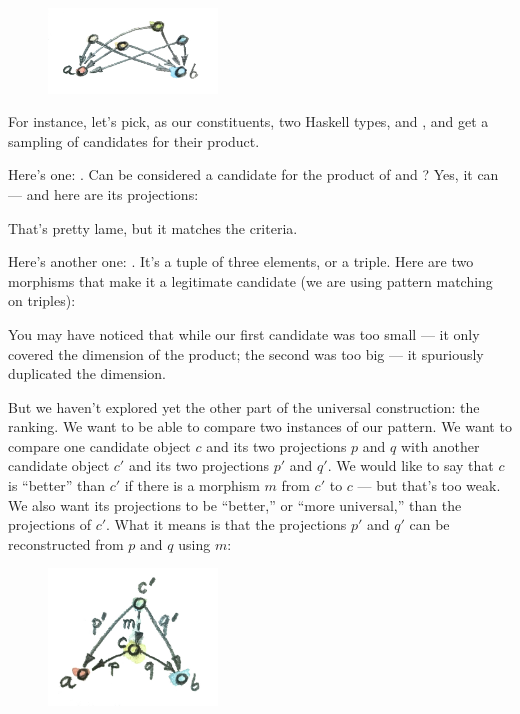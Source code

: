 \begin{figure}[H]
  \centering
  \includegraphics[width=0.4\textwidth]{images/productcandidates.jpg}
\end{figure}

\noindent
For instance, let's pick, as our constituents, two Haskell types,
 and , and get a sampling of candidates for
their product.

Here's one: . Can  be considered a candidate for
the product of  and ? Yes, it can --- and here
are its projections:

That's pretty lame, but it matches the criteria.

Here's another one: . It's a tuple of three
elements, or a triple. Here are two morphisms that make it a legitimate
candidate (we are using pattern matching on triples):

You may have noticed that while our first candidate was too small --- it
only covered the  dimension of the product; the second was
too big --- it spuriously duplicated the  dimension.

But we haven't explored yet the other part of the universal
construction: the ranking. We want to be able to compare two instances
of our pattern. We want to compare one candidate object $c$ and its
two projections $p$ and $q$ with another candidate object
$c'$ and its two projections $p'$ and $q'$. We would like
to say that $c$ is ``better'' than $c'$ if there is a morphism
$m$ from $c'$ to $c$ --- but that's too weak. We also
want its projections to be ``better,'' or ``more universal,'' than the
projections of $c'$. What it means is that the projections
$p'$ and $q'$ can be reconstructed from $p$ and $q$ using $m$:


\begin{figure}[H]
  \centering
  \includegraphics[width=0.4\textwidth]{images/productranking.jpg}
\end{figure}


